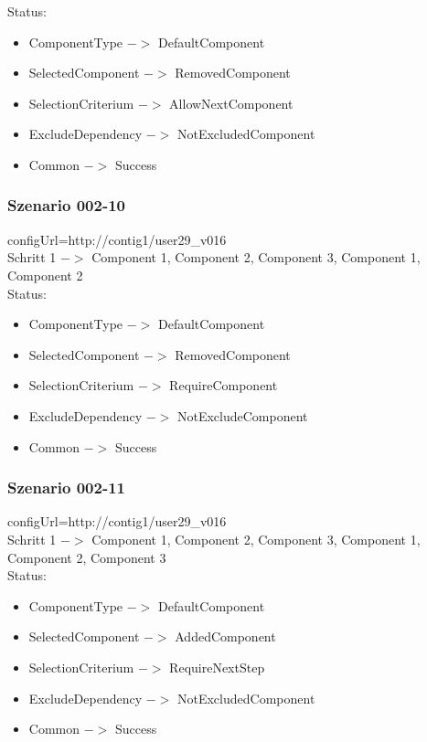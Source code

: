\documentclass{article}
\begin{document}
\noindent Status:

\begin{itemize}
  \item ComponentType $->$ DefaultComponent
  \item SelectedComponent $->$ RemovedComponent
  \item SelectionCriterium $->$ AllowNextComponent
  \item ExcludeDependency $->$ NotExcludedComponent
  \item Common $->$ Success
\end{itemize}

\subsubsection{Szenario 002-10}

configUrl=http://contig1/user29\_v016\\

\noindent Schritt 1 $->$ Component 1, Component 2, Component 3, Component 1,
Component 2\\

\noindent Status:

\begin{itemize}
  \item ComponentType $->$ DefaultComponent
  \item SelectedComponent $->$ RemovedComponent
  \item SelectionCriterium $->$ RequireComponent
  \item ExcludeDependency $->$ NotExcludeComponent
  \item Common $->$ Success
\end{itemize}

\subsubsection{Szenario 002-11}

configUrl=http://contig1/user29\_v016\\

\noindent Schritt 1 $->$ Component 1, Component 2, Component 3, Component 1,
Component 2, Component 3\\

\noindent Status:

\begin{itemize}
  \item ComponentType $->$ DefaultComponent
  \item SelectedComponent $->$ AddedComponent
  \item SelectionCriterium $->$ RequireNextStep
  \item ExcludeDependency $->$ NotExcludedComponent
  \item Common $->$ Success
\end{itemize}
\end{document}
